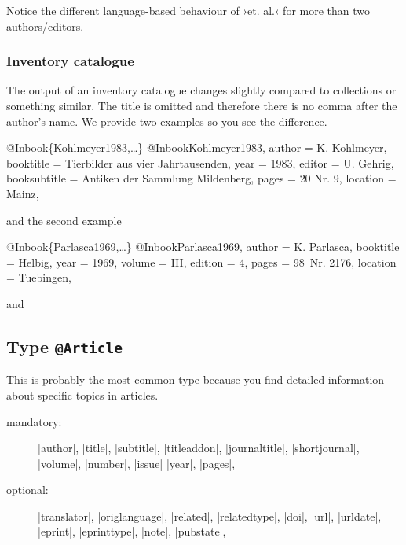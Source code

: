 \documentclass[a4paper,
10pt,
greek,
french,
spanish,
italian,
ngerman,
english
]{ltxdoc}
\begin{document}
Notice the different language-based behaviour of ›et. al.‹ for more than two authors/editors.

 
\subsubsection{Inventory catalogue}
The output of an inventory catalogue changes slightly compared to collections or something similar. 
The title is omitted and therefore there is no comma after the author’s name.
We provide two examples so you see the difference.
\begin{bibexample}[label=Kohlmeyer1983]{{@}Inbook\{Kohlmeyer1983,…\}}
@Inbook{Kohlmeyer1983,
  author       = {K. Kohlmeyer},
  booktitle    = {Tierbilder aus vier Jahrtausenden},
  year         = {1983},
  editor       = {U. Gehrig},
  booksubtitle = {Antiken der Sammlung Mildenberg},
  pages        = {20 Nr. 9},
  location     = Mainz, %
}
\end{bibexample}
and the second example

\begin{bibexample}[label=Parlasca1969]{{@}Inbook\{Parlasca1969,…\}}
@Inbook{Parlasca1969,
  author    = {K. Parlasca},
  booktitle = {Helbig},
  year      = {1969},
  volume    = {III},
  edition   = {4},
  pages     = {98\psq\ Nr. 2176},
  location  = Tuebingen, %
}
\end{bibexample}


and


\subsection{Type \texttt{@Article}}\label{article}
 This is probably the most common type 
because you find detailed information about specific topics in articles.

\begin{description}
\item[mandatory:] 
|author|, |title|, |subtitle|, |titleaddon|,
|journaltitle|, |shortjournal|, |volume|, |number|, |issue|
|year|, |pages|, 
\item[optional:]
|translator|, |origlanguage|,
|related|, |relatedtype|,
|doi|, |url|, |urldate|, |eprint|, |eprinttype|, |note|, |pubstate|, 
 \end{description}
\end{document}
